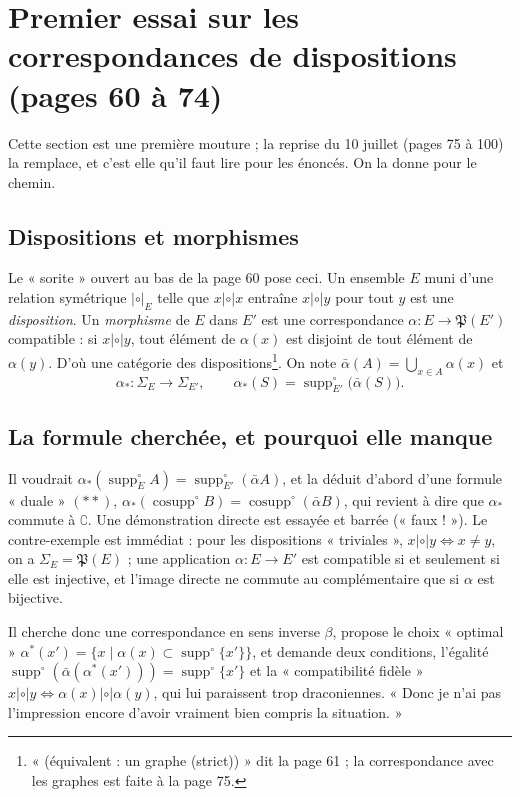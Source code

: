\documentclass[11pt,a4paper]{article}
\begin{document}
\section*{Premier essai sur les correspondances de dispositions (pages 60 à 74)}

Cette section est une première mouture ; la reprise du 10 juillet (pages 75 à
100) la remplace, et c'est elle qu'il faut lire pour les énoncés. On la donne
pour le chemin.

\subsection*{Dispositions et morphismes}

Le « sorite » ouvert au bas de la page 60 pose ceci. Un ensemble $E$ muni d'une relation symétrique $\mathrel{|\circ|}_{E}$ telle que
$x \mathrel{|\circ|} x$ entraîne $x \mathrel{|\circ|} y$ pour tout $y$ est une
\emph{disposition}. Un \emph{morphisme} de $E$ dans $E'$ est une correspondance
$\alpha : E \to \mathfrak{P}(E')$ compatible : si $x \mathrel{|\circ|} y$, tout
élément de $\alpha(x)$ est disjoint de tout élément de $\alpha(y)$. D'où une
catégorie des dispositions\footnote{« (équivalent : un graphe (strict)) » dit la
page 61 ; la correspondance avec les graphes est faite à la page 75.}. On note
$\bar\alpha(A) = \bigcup_{x \in A} \alpha(x)$ et
\[
\alpha_{*} : \Sigma_{E} \to \Sigma_{E'}, \qquad \alpha_{*}(S) =
\operatorname{supp}^{\circ}_{E'}\bigl(\bar\alpha(S)\bigr) .
\]

\subsection*{La formule cherchée, et pourquoi elle manque}

Il voudrait $\alpha_{*}(\operatorname{supp}^{\circ}_{E} A) =
\operatorname{supp}^{\circ}_{E'}(\bar\alpha A)$, et la déduit d'abord d'une
formule « duale » $(**)$, $\alpha_{*}(\operatorname{cosupp}^{\circ} B) =
\operatorname{cosupp}^{\circ}(\bar\alpha B)$, qui revient à dire que
$\alpha_{*}$ commute à $\complement$. Une démonstration directe est essayée et
barrée (« faux ! »). Le contre-exemple est immédiat : pour les dispositions
« triviales », $x \mathrel{|\circ|} y \iff x \neq y$, on a $\Sigma_{E} =
\mathfrak{P}(E)$ ; une application $\alpha : E \to E'$ est compatible si et
seulement si elle est injective, et l'image directe ne commute au complémentaire
que si $\alpha$ est bijective.

Il cherche donc une correspondance en sens inverse $\beta$, propose le choix
« optimal » $\alpha^{*}(x') = \{ x \mid \alpha(x) \subset
\operatorname{supp}^{\circ}\{x'\}\}$, et demande deux conditions, l'égalité
$\operatorname{supp}^{\circ}(\bar\alpha(\alpha^{*}(x'))) =
\operatorname{supp}^{\circ}\{x'\}$ et la « compatibilité fidèle » $x \mathrel{|\circ|}
y \iff \alpha(x) \mathrel{|\circ|} \alpha(y)$, qui lui paraissent trop
draconiennes. « Donc je n'ai pas l'impression encore d'avoir vraiment bien
compris la situation. »
\end{document}

